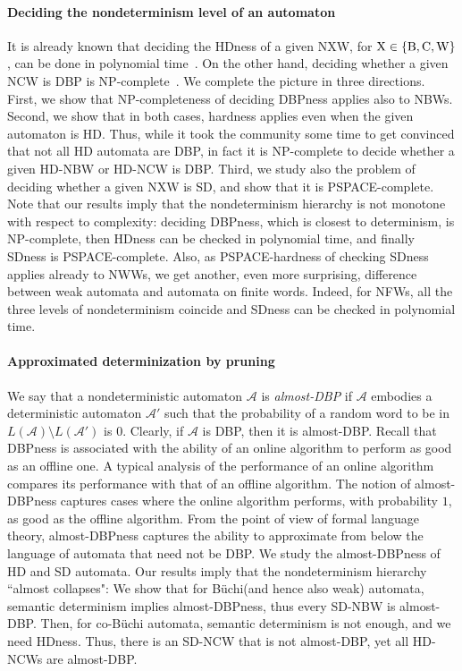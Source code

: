 \documentclass[10pt,a4paper]{amsart}
\theoremstyle{definition}
\numberwithin{equation}{section}
\newcommand{\buchi}{B\"uchi\xspace}
\newcommand{\A}{{\mathcal A}}
\newcommand{\nxw}{NXW\xspace}
\begin{document}
\paragraph{Deciding the nondeterminism level of an automaton} It is already known that deciding the HDness of a given \nxw, for ${\rm X} \in \{{\rm B,C,W}\}$,  can be done in polynomial time~\cite{AKL10, KS15, BK18}. On the other hand, deciding whether a given NCW is DBP is NP-complete~\cite{KM18}. We complete the picture in three directions. First, we show that NP-completeness of deciding DBPness applies also to NBWs. Second, we show that in both cases, hardness applies even when the given automaton is HD. Thus, while it took the community some time to get convinced that not all HD automata are DBP, in fact it is NP-complete to decide whether a given HD-NBW or HD-NCW is DBP.  Third, we study also the problem of deciding whether a given \nxw is SD, and show that it is PSPACE-complete. Note that our results imply that the nondeterminism hierarchy is not monotone with respect to complexity: deciding DBPness, which is closest to determinism, is NP-complete, then HDness can be checked in polynomial time, and finally SDness is PSPACE-complete. Also, as PSPACE-hardness of checking SDness applies already to NWWs, we get another, even more surprising, difference between weak automata and automata on finite words. Indeed, for NFWs, all the three levels of nondeterminism coincide and SDness can be checked in polynomial time.  

\paragraph{Approximated determinization by pruning}
We say that a nondeterministic automaton $\A$ is {\em almost-DBP} if $\A$ embodies a deterministic automaton $\A'$ such that the probability of a random word to be in $L(\A)\setminus L(\A')$ is $0$. Clearly, if $\A$ is DBP, then it is almost-DBP. 
Recall that DBPness is associated with the ability of an online algorithm to perform as good as an offline one. A typical analysis of the performance of an online algorithm compares its performance with that of an offline algorithm. 
The notion of almost-DBPness captures cases where the online algorithm performs, with probability $1$, as good as the offline algorithm. From the point of view of formal language theory, almost-DBPness captures the ability to approximate from below the language of automata that need not be DBP.  
We study the almost-DBPness of HD and SD automata. Our results imply that the nondeterminism hierarchy ``almost collapses":
We show that for \buchi (and hence also weak) automata, semantic determinism implies almost-DBPness, thus every SD-NBW is almost-DBP. Then, for co-\buchi automata, semantic determinism is not enough, and we need HDness. Thus, there is an SD-NCW that is not almost-DBP, yet all HD-NCWs are almost-DBP. 
\end{document}
